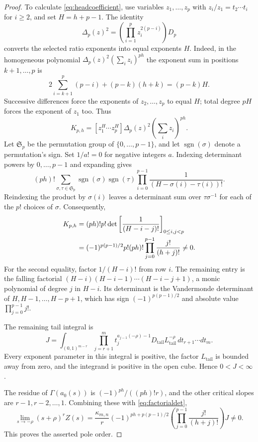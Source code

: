 \documentclass[11pt,a4paper]{article}
\numberwithin{equation}{section}
\theoremstyle{definition}
\begin{document}
\begin{proof}
To calculate \eqref{eq:headcoefficient}, use variables
$z_1,\ldots,z_p$ with $z_i/z_1=t_2\cdots t_i$ for $i\ge2$, and set
$H=h+p-1$. The identity
\[
\Delta_p(z)^2=\left(\prod_{i=1}^p z_i^{2(p-i)}\right)D_p
\]
converts the selected ratio exponents into equal exponents $H$.
Indeed, in the homogeneous polynomial
$\Delta_p(z)^2(\sum_i z_i)^{ph}$ the exponent sum in positions
$k+1,\ldots,p$ is
\[
2\sum_{i=k+1}^p(p-i)+(p-k)(h+k)=(p-k)H.
\]
Successive differences force the exponents of $z_2,\ldots,z_p$
to equal $H$; total degree $pH$ forces the exponent of $z_1$ too.
Thus
\begin{equation}\label{eq:centralcoefficient}
K_{p,h}=[z_1^H\cdots z_p^H]\Delta_p(z)^2(\textstyle\sum_i z_i)^{ph}.
\end{equation}
Let $\mathfrak S_p$ be the permutation group of $\{0,\ldots,p-1\}$,
and let $\operatorname{sgn}(\sigma)$ denote a permutation's sign.
Set $1/a!=0$ for negative integers $a$.
Indexing determinant powers by $0,\ldots,p-1$ and expanding gives
\[
(ph)!\sum_{\sigma,\tau\in\mathfrak S_p}
 \operatorname{sgn}(\sigma)\operatorname{sgn}(\tau)
 \prod_{i=0}^{p-1}\frac1{(H-\sigma(i)-\tau(i))!}.
\]
Reindexing the product by $\sigma(i)$ leaves a determinant sum over
$\tau\sigma^{-1}$ for each of the $p!$ choices of $\sigma$.
Consequently,
\begin{align}
K_{p,h}
 &=(ph)!p!\det\left[\frac1{(H-i-j)!}\right]_{0\le i,j<p}\notag\\
 &=(-1)^{p(p-1)/2}p!(ph)!
                         \prod_{j=0}^{p-1}\frac{j!}{(h+j)!}\ne0.
\label{eq:factorialdet}
\end{align}
For the second equality, factor $1/(H-i)!$ from row $i$.
The remaining entry is the falling factorial
$(H-i)(H-i-1)\cdots(H-i-j+1)$, a monic polynomial of degree $j$
in $H-i$. Its determinant is the Vandermonde determinant of
$H,H-1,\ldots,H-p+1$, which has sign $(-1)^{p(p-1)/2}$ and
absolute value $\prod_{j=0}^{p-1}j!$.

The remaining tail integral is
\[
J=\int_{(0,1)^{m-r}}
\prod_{j=r+1}^m t_j^{a_{j-1}(-\rho)-1}
D_{\mathrm{tail}}L_{\mathrm{tail}}^{-\rho}
\,dt_{r+1}\cdots dt_m.
\]
Every exponent parameter in this integral is positive, the factor
$L_{\mathrm{tail}}$ is bounded away from zero, and the integrand is
positive in the open cube. Hence $0<J<\infty$.

The residue of $\Gamma(a_0(s))$ is
$(-1)^{ph}/((ph)!r)$, and the other critical slopes are
$r-1,r-2,\ldots,1$. Combining these with \eqref{eq:factorialdet},
\begin{equation}\label{eq:highestresidue}
\lim_{s\to-\rho}(s+\rho)^rZ(s)
=\frac{\kappa_{m,n}}{r}
(-1)^{ph+p(p-1)/2}
\left(\prod_{j=0}^{p-1}\frac{j!}{(h+j)!}\right)J\ne0.
\end{equation}
This proves the asserted pole order.
\end{proof}
\end{document}
